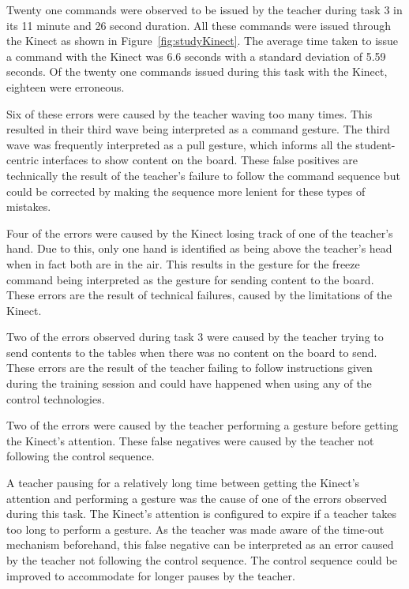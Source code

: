 \documentclass[manuscript, review, screen]{acmart}
\begin{document}
Twenty one commands were observed to be issued by the teacher during task 3 in its 11 minute and 26 second duration.
All these commands were issued through the Kinect as shown in Figure~\ref{fig:studyKinect}.
The average time taken to issue a command with the Kinect was 6.6 seconds with a standard deviation of 5.59 seconds.
Of the twenty one commands issued during this task with the Kinect, eighteen were erroneous.

Six of these errors were caused by the teacher waving too many times.
This resulted in their third wave being interpreted as a command gesture.
The third wave was frequently interpreted as a pull gesture, which informs all the student-centric interfaces to show content on the board.
These false positives are technically the result of the teacher's failure to follow the command sequence but could be corrected by making the sequence more lenient for these types of mistakes.

Four of the errors were caused by the Kinect losing track of one of the teacher's hand.
Due to this, only one hand is identified as being above the teacher's head when in fact both are in the air.
This results in the gesture for the freeze command being interpreted as the gesture for sending content to the board.
These errors are the result of technical failures, caused by the limitations of the Kinect.

Two of the errors observed during task 3 were caused by the teacher trying to send contents to the tables when there was no content on the board to send.
These errors are the result of the teacher failing to follow instructions given during the training session and could have happened when using any of the control technologies.

Two of the errors were caused by the teacher performing a gesture before getting the Kinect's attention.
These false negatives were caused by the teacher not following the control sequence.

A teacher pausing for a relatively long time between getting the Kinect's attention and performing a gesture was the cause of one of the errors observed during this task.
The Kinect's attention is configured to expire if a teacher takes too long to perform a gesture.
As the teacher was made aware of the time-out mechanism beforehand, this false negative can be interpreted as an error caused by the teacher not following the control sequence.
The control sequence could be improved to accommodate for longer pauses by the teacher.
\end{document}
